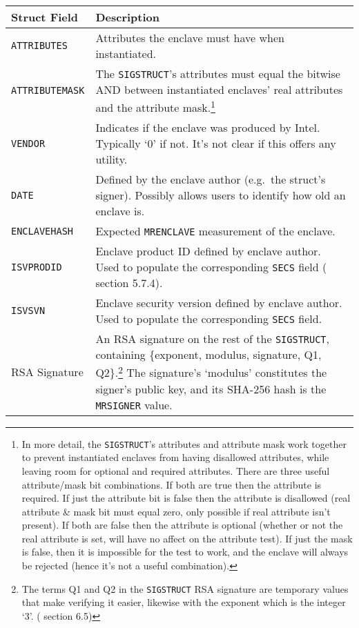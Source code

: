 \begin{tabularx}{\textwidth}{|l|X|}
\caption{{\tt SIGSTRUCT} Contents}
\label{table:sgx-sigstruct}\\
\hline
    Struct Field & Description \\
\hline\hline
    {\tt ATTRIBUTES} & Attributes the enclave must have when instantiated. \\
\hline
    {\tt ATTRIBUTEMASK} & The {\tt SIGSTRUCT}'s attributes must equal the bitwise AND between instantiated enclaves' real attributes and the attribute mask.\footnote{In more detail, the {\tt SIGSTRUCT}'s attributes and attribute mask work together to prevent instantiated enclaves from having disallowed attributes, while leaving room for optional and required attributes. There are three useful attribute/mask bit combinations. If both are true then the attribute is required. If just the attribute bit is false then the attribute is disallowed (real attribute \& mask bit must equal zero, only possible if real attribute isn't present). If both are false then the attribute is optional (whether or not the real attribute is set, will have no affect on the attribute test). If just the mask is false, then it is impossible for the test to work, and the enclave will always be rejected (hence it's not a useful combination).} \\
\hline
    {\tt VENDOR} & Indicates if the enclave was produced by Intel. Typically `0' if not. It's not clear if this offers any utility. \\
\hline
    {\tt DATE} & Defined by the enclave author (e.g.\ the struct's signer). Possibly allows users to identify how old an enclave is. \\
\hline
    {\tt ENCLAVEHASH} & Expected {\tt MRENCLAVE} measurement of the enclave. \\
\hline
    {\tt ISVPRODID} & Enclave product ID defined by enclave author. Used to populate the corresponding {\tt SECS} field (\cite{intel-sgx-explained-advanced} section 5.7.4). \\
\hline
    {\tt ISVSVN} & Enclave security version defined by enclave author. Used to populate the corresponding {\tt SECS} field. \\
\hline
    RSA Signature & An RSA signature on the rest of the {\tt SIGSTRUCT}, containing \{exponent, modulus, signature, Q1, Q2\}.\footnote{The terms Q1 and Q2 in the {\tt SIGSTRUCT} RSA signature are temporary values that make verifying it easier, likewise with the exponent which is the integer `3'. (\cite{intel-sgx-explained-advanced} section 6.5)} The signature's `modulus' constitutes the signer's public key, and its SHA-256 hash is the {\tt MRSIGNER} value. \\
\hline
\end{tabularx}

